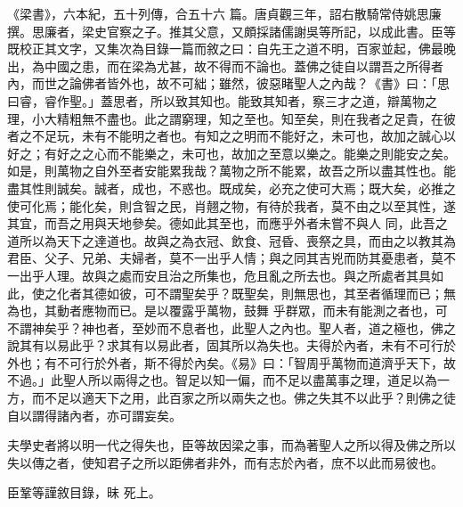
\begin{pinyinscope}

 《梁書》，六本紀，五十列傳，合五十六
 篇。唐貞觀三年，詔右散騎常侍姚思廉撰。思廉者，梁史官察之子。推其父意，又頗採諸儒謝吳等所記，以成此書。臣等既校正其文字，又集次為目錄一篇而敘之曰：自先王之道不明，百家並起，佛最晚出，為中國之患，而在梁為尤甚，故不得而不論也。蓋佛之徒自以謂吾之所得者內，而世之論佛者皆外也，故不可絀；雖然，彼惡睹聖人之內哉？《書》曰：「思曰睿，睿作聖。」蓋思者，所以致其知也。能致其知者，察三才之道，辯萬物之理，小大精粗無不盡也。此之謂窮理，知之至也。知至矣，則在我者之足貴，在彼者之不足玩，未有不能明之者也。有知之之明而不能好之，未可也，故加之誠心以好之；有好之之心而不能樂之，未可也，故加之至意以樂之。能樂之則能安之矣。如是，則萬物之自外至者安能累我哉？萬物之所不能累，故吾之所以盡其性也。能盡其性則誠矣。誠者，成也，不惑也。既成矣，必充之使可大焉；既大矣，必推之使可化焉；能化矣，則含智之民，肖翹之物，有待於我者，莫不由之以至其性，遂其宜，而吾之用與天地參矣。德如此其至也，而應乎外者未嘗不與人
 同，此吾之道所以為天下之達道也。故與之為衣冠、飲食、冠昏、喪祭之具，而由之以教其為君臣、父子、兄弟、夫婦者，莫不一出乎人情；與之同其吉兇而防其憂患者，莫不一出乎人理。故與之處而安且治之所集也，危且亂之所去也。與之所處者其具如此，使之化者其德如彼，可不謂聖矣乎？既聖矣，則無思也，其至者循理而已；無為也，其動者應物而已。是以覆露乎萬物，鼓舞
 乎群眾，而未有能測之者也，可不謂神矣乎？神也者，至妙而不息者也，此聖人之內也。聖人者，道之極也，佛之說其有以易此乎？求其有以易此者，固其所以為失也。夫得於內者，未有不可行於外也；有不可行於外者，斯不得於內矣。《易》曰：「智周乎萬物而道濟乎天下，故不過。」此聖人所以兩得之也。智足以知一偏，而不足以盡萬事之理，道足以為一方，而不足以適天下之用，此百家之所以兩失之也。佛之失其不以此乎？則佛之徒自以謂得諸內者，亦可謂妄矣。



 夫學史者將以明一代之得失也，臣等故因梁之事，而為著聖人之所以得及佛之所以失以傳之者，使知君子之所以距佛者非外，而有志於內者，庶不以此而易彼也。



 臣鞏等謹敘目錄，昧
 死上。



\end{pinyinscope}